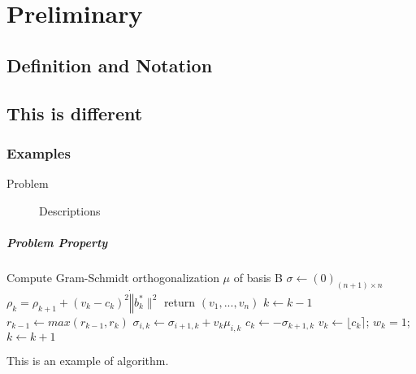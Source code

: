 \chapter{Preliminary}

\section{Definition and Notation}
\section*{This is different}
    \subsection*{Examples}
    \label{sec:examples}
    
    \begin{description}
        \item[Problem] Descriptions
    \end{description}
    
    \paragraph{Problem Property}

\begin{algorithm}
    \label{tab:alg}
    \centering
    \begin{algorithmic}[H]
        \State  Compute Gram-Schmidt orthogonalization $\mu$ of basis B  
        \State    $\sigma \leftarrow (0)_{(n+1) \times n}$
            \State $\rho_k = \rho_{k+1} + (v_k - c_k)^2 \dot \| {b_k^*} \|^2$ 
                    \State return $(v_1,...,v_n)$ 
                \Else  
                    \State $k \leftarrow k - 1$
                    \State $r_{k-1} \leftarrow max(r_{k-1}, r_{k})$
                        \State $\sigma_{i,k} \leftarrow \sigma_{i+1,k} + v_k \mu_{i,k}$ 
                    \EndFor
                    \State $c_k \leftarrow -\sigma_{k+1,k}$ 
                    \State $v_k \leftarrow \lfloor c_k \rceil$; $w_k = 1$;
                \EndIf
            \Else
                \State $k \leftarrow k+1 $
            \EndIf 
        \EndWhile
    \end{algorithmic}
    \vspace*{1em}
    \caption{This is an example of algorithm.}
\end{algorithm}



